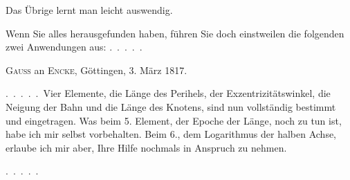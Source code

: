 \begin{landscape}
\begin{center}
\end{center}
\par\noindent Das Übrige lernt man leicht auswendig.
\par\noindent\hspace*{\parindent}Wenn Sie alles herausgefunden haben, führen Sie doch einstweilen die folgenden
zwei Anwendungen aus: .\ .\ .\ .\ .
\par\medskip
\begin{center}\textsc{Gauss} an \textsc{Encke}, Göttingen, 3. März 1817.\end{center}
\par\noindent\hspace*{\parindent}.\ .\ .\ .\ .\ Vier Elemente, die Länge des Perihels, der Exzentrizitätswinkel, die Neigung
der Bahn und die Länge des Knotens, sind nun vollständig bestimmt und eingetragen. Was beim 5. Element, der Epoche der Länge, noch zu tun
ist, habe ich mir selbst vorbehalten. Beim 6., dem Logarithmus
der halben Achse, erlaube ich mir aber, Ihre Hilfe nochmals in Anspruch zu nehmen.
\par\noindent .\ .\ .\ .\ .
\clearpage
\endgroup
\end{landscape}
